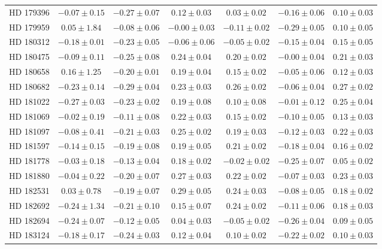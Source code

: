 \begin{table*}
\begin{tabular}{ccccccc}
HD 179396 & $-0.07 \pm 0.15$ & $-0.27 \pm 0.07$ & $0.12 \pm 0.03$ & $0.03 \pm 0.02$ & $-0.16 \pm 0.06$ & $0.10 \pm 0.03$ \\
HD 179959 & $0.05 \pm 1.84$ & $-0.08 \pm 0.06$ & $-0.00 \pm 0.03$ & $-0.11 \pm 0.02$ & $-0.29 \pm 0.05$ & $0.10 \pm 0.05$ \\
HD 180312 & $-0.18 \pm 0.01$ & $-0.23 \pm 0.05$ & $-0.06 \pm 0.06$ & $-0.05 \pm 0.02$ & $-0.15 \pm 0.04$ & $0.15 \pm 0.05$ \\
HD 180475 & $-0.09 \pm 0.11$ & $-0.25 \pm 0.08$ & $0.24 \pm 0.04$ & $0.20 \pm 0.02$ & $-0.00 \pm 0.04$ & $0.21 \pm 0.03$ \\
HD 180658 & $0.16 \pm 1.25$ & $-0.20 \pm 0.01$ & $0.19 \pm 0.04$ & $0.15 \pm 0.02$ & $-0.05 \pm 0.06$ & $0.12 \pm 0.03$ \\
HD 180682 & $-0.23 \pm 0.14$ & $-0.29 \pm 0.04$ & $0.23 \pm 0.03$ & $0.26 \pm 0.02$ & $-0.06 \pm 0.04$ & $0.27 \pm 0.02$ \\
HD 181022 & $-0.27 \pm 0.03$ & $-0.23 \pm 0.02$ & $0.19 \pm 0.08$ & $0.10 \pm 0.08$ & $-0.01 \pm 0.12$ & $0.25 \pm 0.04$ \\
HD 181069 & $-0.02 \pm 0.19$ & $-0.11 \pm 0.08$ & $0.22 \pm 0.03$ & $0.15 \pm 0.02$ & $-0.10 \pm 0.05$ & $0.13 \pm 0.03$ \\
HD 181097 & $-0.08 \pm 0.41$ & $-0.21 \pm 0.03$ & $0.25 \pm 0.02$ & $0.19 \pm 0.03$ & $-0.12 \pm 0.03$ & $0.22 \pm 0.03$ \\
HD 181597 & $-0.14 \pm 0.15$ & $-0.19 \pm 0.08$ & $0.19 \pm 0.05$ & $0.21 \pm 0.02$ & $-0.18 \pm 0.04$ & $0.16 \pm 0.02$ \\
HD 181778 & $-0.03 \pm 0.18$ & $-0.13 \pm 0.04$ & $0.18 \pm 0.02$ & $-0.02 \pm 0.02$ & $-0.25 \pm 0.07$ & $0.05 \pm 0.02$ \\
HD 181880 & $-0.04 \pm 0.22$ & $-0.20 \pm 0.07$ & $0.27 \pm 0.03$ & $0.22 \pm 0.02$ & $-0.07 \pm 0.03$ & $0.23 \pm 0.03$ \\
HD 182531 & $0.03 \pm 0.78$ & $-0.19 \pm 0.07$ & $0.29 \pm 0.05$ & $0.24 \pm 0.03$ & $-0.08 \pm 0.05$ & $0.18 \pm 0.02$ \\
HD 182692 & $-0.24 \pm 1.34$ & $-0.21 \pm 0.10$ & $0.15 \pm 0.07$ & $0.24 \pm 0.02$ & $-0.11 \pm 0.06$ & $0.18 \pm 0.03$ \\
HD 182694 & $-0.24 \pm 0.07$ & $-0.12 \pm 0.05$ & $0.04 \pm 0.03$ & $-0.05 \pm 0.02$ & $-0.26 \pm 0.04$ & $0.09 \pm 0.05$ \\
HD 183124 & $-0.18 \pm 0.17$ & $-0.24 \pm 0.03$ & $0.12 \pm 0.04$ & $0.10 \pm 0.02$ & $-0.22 \pm 0.02$ & $0.10 \pm 0.03$ \\

\end{tabular}
\end{table*}
